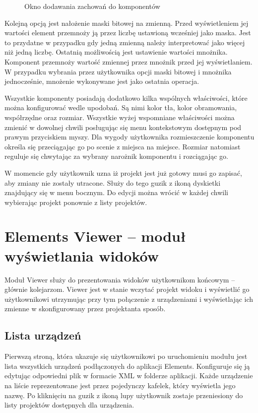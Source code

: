 \begin{itemize}
\begin{figure}[h]
{		}
		\caption{Okno dodawania zachowań do komponentów}
		\label{fig:behaviour}
	\end{figure}
	Kolejną opcją jest nałożenie maski bitowej na zmienną. Przed wyświetleniem jej wartości element przemnoży ją przez liczbę ustawioną wcześniej jako maska. Jest to przydatne w przypadku gdy jedną zmienną należy interpretować jako więcej niż jedną liczbę. Ostatnią możliwością jest ustawienie wartości mnożnika. Komponent przemnoży wartość zmiennej przez mnożnik przed jej wyświetlaniem. W przypadku wybrania przez użytkownika opcji maski bitowej i mnożnika jednocześnie, mnożenie wykonywane jest jako ostatnia operacja.
\end{itemize}

Wszystkie komponenty posiadają dodatkowo kilka wspólnych właściwości, które można konfigurować wedle upodobań. Są nimi kolor tła, kolor obramowania, współrzędne oraz rozmiar. Wszystkie wyżej wspomniane właściwości można zmienić w dowolnej chwili posługując się menu kontekstowym dostępnym pod prawym przyciskiem myszy.  Dla wygody użytkownika rozmieszczenie komponentu określa się przeciągając go po scenie z miejsca na miejsce. Rozmiar natomiast reguluje się chwytając za wybrany narożnik komponentu i rozciągając go.

W momencie gdy użytkownik uzna iż projekt jest już gotowy musi go zapisać, aby zmiany nie zostały utracone. Służy do tego guzik z ikoną dyskietki znajdujący się w menu bocznym. Do edycji można wrócić w każdej chwili wybierając projekt ponownie z listy projektów.


\section{Elements Viewer – moduł wyświetlania widoków}
Moduł Viewer służy do prezentowania widoków użytkownikom końcowym – głównie kolejarzom. Viewer jest w stanie wczytać projekt widoku i wyświetlić go użytkownikowi utrzymując przy tym połączenie z urządzeniami i wyświetlając ich zmienne w skonfigurowany przez projektanta sposób.

\subsection{Lista urządzeń}
Pierwszą stroną, która ukazuje się użytkownikowi po uruchomieniu modułu jest lista wszystkich urządzeń podłączonych do aplikacji Elements. Konfiguruje się ją edytując odpowiedni plik w formacie XML w folderze aplikacji. Każde urządzenie na liście reprezentowane jest przez pojedynczy kafelek, który wyświetla jego nazwę. Po kliknięciu na guzik z ikoną lupy użytkownik zostaje przeniesiony do listy projektów dostępnych dla urządzenia.

